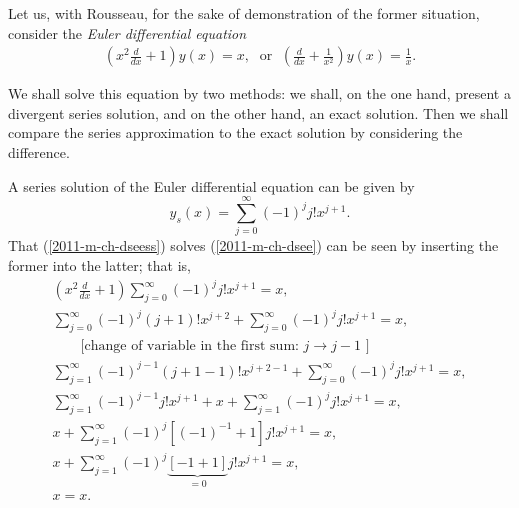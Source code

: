 Let us, with Rousseau,
for the sake of demonstration of the former situation,
consider the {\em Euler differential equation}
\begin{equation}
\begin{split}
\left(x^2 \frac{d}{dx} +1\right) y(x) = {x},\;\textrm{ or }\;
\left(\frac{d}{dx} +\frac{1}{x^2}\right) y(x) = \frac{1}{x}.
\end{split}
\label{2011-m-ch-dsee}
\end{equation}

We shall solve this equation by two methods:  we shall, on the one hand,
present a divergent series solution, and on the other hand, an exact solution.
Then we shall  compare the series approximation to the exact solution by considering
the difference.

A series solution of the Euler differential equation can be given by
\begin{equation}
{y_s} (x) = \sum_{j=0}^\infty (-1)^j j! x^{j+1}.
\label{2011-m-ch-dseess}
\end{equation}
That (\ref{2011-m-ch-dseess})
solves  (\ref{2011-m-ch-dsee})
can be seen by inserting the former into the latter; that is,
\begin{equation}
\begin{split}
\left(x^2 \frac{d}{dx} +1\right) \sum_{j=0}^\infty (-1)^j j! x^{j+1} = {x},  \\
\sum_{j=0}^\infty (-1)^j (j+1)! x^{j+2} + \sum_{j=0}^\infty (-1)^j j! x^{j+1} = {x},  \\
\qquad \textrm{[change of variable in the first sum: } j \rightarrow j-1\textrm{ ]}\\
\sum_{j=1}^\infty (-1)^{j-1} (j+1-1)! x^{j+2-1} + \sum_{j=0}^\infty (-1)^j j! x^{j+1} = {x},  \\
\sum_{j=1}^\infty (-1)^{j-1} j! x^{j+1} + x +\sum_{j=1}^\infty (-1)^j j! x^{j+1} = {x},  \\
x +\sum_{j=1}^\infty (-1)^j\left[(-1)^{-1} +1\right] j! x^{j+1}    = {x},  \\
x +\sum_{j=1}^\infty (-1)^j \underbrace{\left[ -1  +1\right]}_{=0} j! x^{j+1}    = {x},  \\
x    = {x}.  \\
\end{split}
\label{2011-m-ch-dsee111}
\end{equation}


